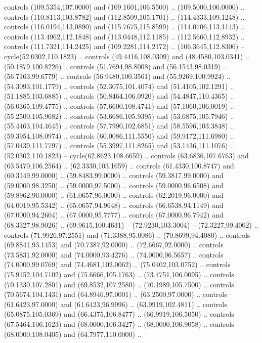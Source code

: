  controls (109.5354,107.0000) and (109.1601,106.5500) .. (109.5000,106.0000) ..
  controls (110.8113,103.8782) and (112.8509,105.1701) .. (114.4333,109.1248) ..
  controls (116.0194,113.0890) and (115.7675,115.8599) .. (114.0706,113.1143) ..
  controls (113.4962,112.1848) and (113.0448,112.1185) .. (112.5660,112.8932) ..
  controls (111.7321,114.2425) and (109.2281,114.2172) .. (106.3645,112.8306) --
  cycle(52.0302,110.1823) .. controls (49.4416,108.0309) and (48.4580,103.0341)
  .. (50.1879,100.8226) .. controls (51.7694,98.8008) and (56.1543,98.0319) ..
  (56.7163,99.6779) .. controls (56.9480,100.3561) and (55.9269,100.9924) ..
  (54.3093,101.1779) .. controls (52.3075,101.4074) and (51.4105,102.1291) ..
  (51.1885,103.6885) .. controls (50.8464,106.0920) and (54.4847,110.4365) ..
  (56.0365,109.4775) .. controls (57.6600,108.4741) and (57.1060,106.0019) ..
  (55.2500,105.9682) .. controls (53.6686,105.9395) and (53.6875,105.7946) ..
  (55.4463,104.4645) .. controls (57.7990,102.6851) and (58.5596,103.3848) ..
  (59.3954,108.0974) .. controls (60.0086,111.5550) and (59.9172,111.6980) ..
  (57.0439,111.7797) .. controls (55.3997,111.8265) and (53.1436,111.1076) ..
  (52.0302,110.1823) -- cycle(62.8623,108.6659) .. controls (63.6836,107.6763)
  and (63.5470,106.2564) .. (62.3330,103.1659) .. controls (61.4330,100.8747)
  and (60.3149,99.0000) .. (59.8483,99.0000) .. controls (59.3817,99.0000) and
  (59.0000,98.3250) .. (59.0000,97.5000) .. controls (59.0000,96.6508) and
  (59.8962,96.0000) .. (61.0657,96.0000) .. controls (62.2019,96.0000) and
  (64.0019,95.5342) .. (65.0657,94.9648) .. controls (66.6538,94.1149) and
  (67.0000,94.2604) .. (67.0000,95.7777) .. controls (67.0000,96.7942) and
  (68.3327,98.9026) .. (69.9615,100.4631) -- (72.9230,103.3004) --
  (72.3227,99.4002) .. controls (71.9926,97.2551) and (71.3388,95.0086) ..
  (70.8699,94.4080) .. controls (69.8841,93.1453) and (70.7387,92.0000) ..
  (72.6667,92.0000) .. controls (73.5831,92.0000) and (74.0000,93.4276) ..
  (74.0000,96.5657) .. controls (74.0000,99.0769) and (74.4681,102.0062) ..
  (75.0402,103.0752) .. controls (75.9152,104.7102) and (75.6666,105.1763) ..
  (73.4751,106.0095) .. controls (70.1330,107.2801) and (69.8532,107.2580) ..
  (70.1989,105.7500) .. controls (70.5674,104.1431) and (64.8946,97.0001) ..
  (63.2500,97.0000) .. controls (61.6423,97.0000) and (61.6423,96.9996) ..
  (63.9919,102.4811) .. controls (65.0875,105.0369) and (66.4375,106.8477) ..
  (66.9919,106.5050) .. controls (67.5464,106.1623) and (68.0000,106.3427) ..
  (68.0000,106.9058) .. controls (68.0000,108.0405) and (64.7977,110.0000) ..
